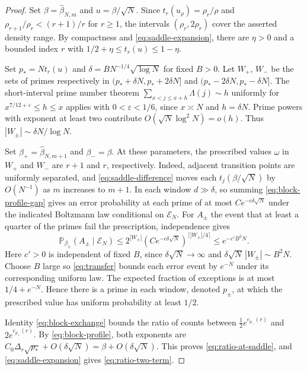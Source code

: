 \documentclass[11pt]{amsart}
\theoremstyle{remark}
\newcommand{\Pp}{\mathbb P}
\begin{document}
\begin{proof}
Set \(\beta=\widehat\beta_{N,m}\) and \(u=\beta/\sqrt N\).
Since \(t_r(u_\rho)=\rho_r/\rho\) and \(\rho_{r+1}/\rho_r<(r+1)/r\)
for \(r\ge1\), the intervals \((\rho_r,2\rho_r)\) cover the asserted
density range. By compactness and \eqref{eq:saddle-expansion}, there are
\(\eta>0\) and a bounded index \(r\) with \(1/2+\eta\le t_r(u)\le1-\eta\).

Set \(p_*=Nt_r(u)\) and \(\delta=B N^{-1/4}\sqrt{\log N}\) for fixed
\(B>0\). Let \(W_+\), \(W_-\) be the sets of primes respectively in
\((p_*+\delta N,p_*+2\delta N]\) and \((p_*-2\delta N,p_*-\delta N]\).
The short-interval prime number theorem
\(\sum_{x<j\le x+h}\Lambda(j)\sim h\) uniformly for
\(x^{7/12+\varepsilon}\le h\le x\)
\cite[Section~1]{huxley}\cite[Theorem~1]{ingham}\cite[(1.1)]{matomaki-teravainen}
applies with \(0<\varepsilon<1/6\), since \(x\asymp N\) and \(h=\delta N\).
Prime powers with exponent
at least two contribute \(O(\sqrt N\log^2 N)=o(h)\). Thus
\(|W_\pm|\sim\delta N/\log N\).

Set \(\beta_+=\widehat\beta_{N,m+1}\) and \(\beta_-=\beta\).
At these parameters, the prescribed values \(\omega\) in \(W_+\) and
\(W_-\) are \(r+1\) and \(r\), respectively. Indeed, adjacent transition points are
uniformly separated, and \eqref{eq:saddle-difference} moves each
\(t_j(\beta/\sqrt N)\) by \(O(N^{-1})\) as \(m\) increases to \(m+1\).
In each window \(d\gg\delta\), so summing \eqref{eq:block-profile-gap}
gives an error probability at each prime of at most \(C e^{-c\delta\sqrt N}\)
under the indicated Boltzmann law conditional on \(\mathcal E_N\).
For \(A_\pm\) the event that at least a quarter of the primes fail the
prescription, independence gives
\[
 \Pp_{\beta_\pm}(A_\pm\mid\mathcal E_N)
 \le 2^{|W_\pm|}(Ce^{-c\delta\sqrt N})^{\lceil|W_\pm|/4\rceil}
 \le e^{-c'B^2N}.
\]
Here \(c'>0\) is independent of fixed \(B\), since \(\delta\sqrt N\to\infty\)
and \(\delta\sqrt N\,|W_\pm|\sim B^2N\).
Choose \(B\) large so \eqref{eq:transfer} bounds each error event by
\(e^{-N}\) under its corresponding uniform law. The expected fraction
of exceptions is at most \(1/4+e^{-N}\). Hence there is a prime in each
window, denoted \(p_\pm\), at which the prescribed value has uniform
probability at least \(1/2\).

Identity \eqref{eq:block-exchange} bounds the ratio of counts between
\(\tfrac12e^{e_{p_-}(r)}\) and \(2e^{e_{p_+}(r)}\).
By \eqref{eq:block-profile}, both exponents are
\(C_0\Delta_r\sqrt{p_*}+O(\delta\sqrt N)=\beta+O(\delta\sqrt N)\).
This proves \eqref{eq:ratio-at-saddle}, and \eqref{eq:saddle-expansion}
gives \eqref{eq:ratio-two-term}.
\end{proof}
\end{document}
